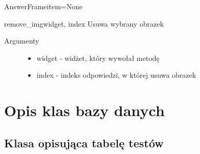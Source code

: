 \documentclass[letterpaper,10pt,polish]{manual}
\begin{document}
\begin{classdesc}{AnswerFrame}{item=None}
\hypertarget{AnswerFrame.AnswerFrame.remove\_img}{}\begin{methoddesc}{remove\_img}{widget, index}
Usuwa wybrany obrazek
\begin{description}
\item[Argumenty] \leavevmode\begin{itemize}
\item {} 
widget - widżet, który wywołał metodę

\item {} 
index - indeks odpowiedzi, w której usuwa obrazek

\end{itemize}

\end{description}
\end{methoddesc}
\end{classdesc}
\hypertarget{dbmodel}{}

\chapter{Opis klas bazy danych}
\hypertarget{module-dbmodel}{}
\modulesynopsis{}

\hypertarget{dbmodel-test}{}\section{Klasa opisująca tabelę testów}
\end{document}
